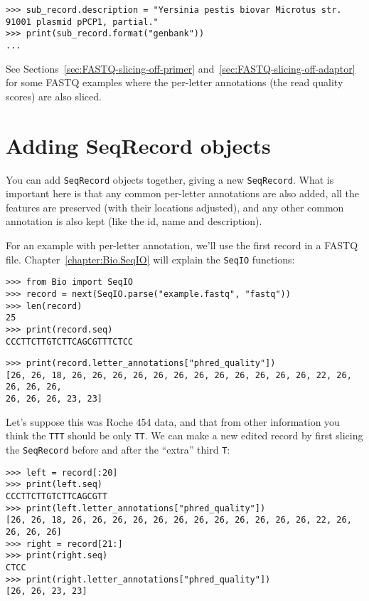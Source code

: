 \begin{verbatim}
>>> sub_record.description = "Yersinia pestis biovar Microtus str. 91001 plasmid pPCP1, partial."
>>> print(sub_record.format("genbank"))
...
\end{verbatim}

See Sections~\ref{sec:FASTQ-slicing-off-primer}
and~\ref{sec:FASTQ-slicing-off-adaptor} for some FASTQ examples where the
per-letter annotations (the read quality scores) are also sliced.

\section{Adding SeqRecord objects}
\label{sec:SeqRecord-addition}

You can add \verb|SeqRecord| objects together, giving a new \verb|SeqRecord|.
What is important here is that any common
per-letter annotations are also added, all the features are preserved (with their
locations adjusted), and any other common annotation is also kept (like the id, name
and description).

For an example with per-letter annotation, we'll use the first record in a
FASTQ file. Chapter~\ref{chapter:Bio.SeqIO} will explain the \verb|SeqIO| functions:

\begin{verbatim}
>>> from Bio import SeqIO
>>> record = next(SeqIO.parse("example.fastq", "fastq"))
>>> len(record)
25
>>> print(record.seq)
CCCTTCTTGTCTTCAGCGTTTCTCC
\end{verbatim}
\begin{verbatim}
>>> print(record.letter_annotations["phred_quality"])
[26, 26, 18, 26, 26, 26, 26, 26, 26, 26, 26, 26, 26, 26, 26, 22, 26, 26, 26, 26,
26, 26, 26, 23, 23]
\end{verbatim}

\noindent Let's suppose this was Roche 454 data, and that from other information
you think the \texttt{TTT} should be only \texttt{TT}. We can make a new edited
record by first slicing the \verb|SeqRecord| before and after the ``extra''
third \texttt{T}:

\begin{verbatim}
>>> left = record[:20]
>>> print(left.seq)
CCCTTCTTGTCTTCAGCGTT
>>> print(left.letter_annotations["phred_quality"])
[26, 26, 18, 26, 26, 26, 26, 26, 26, 26, 26, 26, 26, 26, 26, 22, 26, 26, 26, 26]
>>> right = record[21:]
>>> print(right.seq)
CTCC
>>> print(right.letter_annotations["phred_quality"])
[26, 26, 23, 23]
\end{verbatim}

